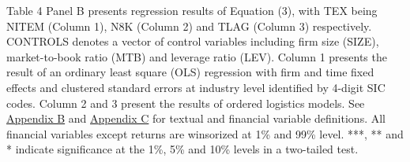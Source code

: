 Table 4 Panel B presents regression results of Equation (3), with TEX being NITEM (Column 1), N8K (Column 2) and TLAG (Column 3) respectively. CONTROLS denotes a vector of control variables including firm size (SIZE), market-to-book ratio (MTB) and leverage ratio (LEV). Column 1 presents the result of an ordinary least square (OLS) regression with firm and time fixed effects and clustered standard errors at industry level identified by 4-digit SIC codes. Column 2 and 3 present the results of ordered logistics models. See \hyperref[appb]{Appendix B} and \hyperref[appc]{Appendix C} for textual and financial variable definitions. All financial variables except returns are winsorized at 1\% and 99\% level. ***, ** and * indicate significance at the 1\%, 5\% and 10\% levels in a two-tailed test.
